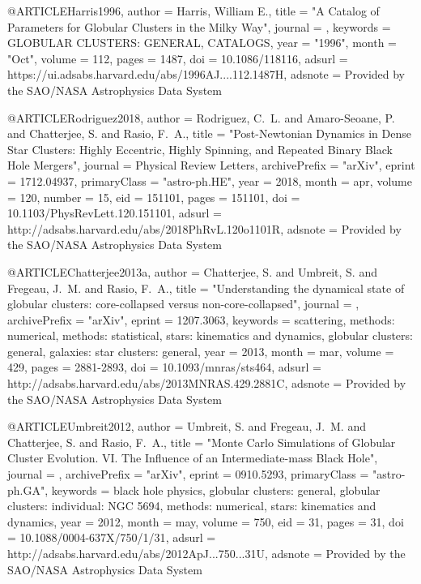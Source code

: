 \documentclass[twocolumn,tighten]{aastex63}
\begin{document}
{@ARTICLE{Harris1996,
       author = {{Harris}, William E.},
        title = "{A Catalog of Parameters for Globular Clusters in the Milky Way}",
      journal = {\aj},
     keywords = {GLOBULAR CLUSTERS: GENERAL, CATALOGS},
         year = "1996",
        month = "Oct",
       volume = {112},
        pages = {1487},
          doi = {10.1086/118116},
       adsurl = {https://ui.adsabs.harvard.edu/abs/1996AJ....112.1487H},
      adsnote = {Provided by the SAO/NASA Astrophysics Data System}
}

@ARTICLE{Rodriguez2018,
   author = {{Rodriguez}, C.~L. and {Amaro-Seoane}, P. and {Chatterjee}, S. and 
	{Rasio}, F.~A.},
    title = "{Post-Newtonian Dynamics in Dense Star Clusters: Highly Eccentric, Highly Spinning, and Repeated Binary Black Hole Mergers}",
  journal = {Physical Review Letters},
archivePrefix = "arXiv",
   eprint = {1712.04937},
 primaryClass = "astro-ph.HE",
     year = 2018,
    month = apr,
   volume = 120,
   number = 15,
      eid = {151101},
    pages = {151101},
      doi = {10.1103/PhysRevLett.120.151101},
   adsurl = {http://adsabs.harvard.edu/abs/2018PhRvL.120o1101R},
  adsnote = {Provided by the SAO/NASA Astrophysics Data System}
}

@ARTICLE{Chatterjee2013a,
   author = {{Chatterjee}, S. and {Umbreit}, S. and {Fregeau}, J.~M. and 
	{Rasio}, F.~A.},
    title = "{Understanding the dynamical state of globular clusters: core-collapsed versus non-core-collapsed}",
  journal = {\mnras},
archivePrefix = "arXiv",
   eprint = {1207.3063},
 keywords = {scattering, methods: numerical, methods: statistical, stars: kinematics and dynamics, globular clusters: general, galaxies: star clusters: general},
     year = 2013,
    month = mar,
   volume = 429,
    pages = {2881-2893},
      doi = {10.1093/mnras/sts464},
   adsurl = {http://adsabs.harvard.edu/abs/2013MNRAS.429.2881C},
  adsnote = {Provided by the SAO/NASA Astrophysics Data System}
}


@ARTICLE{Umbreit2012,
   author = {{Umbreit}, S. and {Fregeau}, J.~M. and {Chatterjee}, S. and 
	{Rasio}, F.~A.},
    title = "{Monte Carlo Simulations of Globular Cluster Evolution. VI. The Influence of an Intermediate-mass Black Hole}",
  journal = {\apj},
archivePrefix = "arXiv",
   eprint = {0910.5293},
 primaryClass = "astro-ph.GA",
 keywords = {black hole physics, globular clusters: general, globular clusters: individual: NGC 5694, methods: numerical, stars: kinematics and dynamics},
     year = 2012,
    month = may,
   volume = 750,
      eid = {31},
    pages = {31},
      doi = {10.1088/0004-637X/750/1/31},
   adsurl = {http://adsabs.harvard.edu/abs/2012ApJ...750...31U},
  adsnote = {Provided by the SAO/NASA Astrophysics Data System}
}

}
\end{document}
